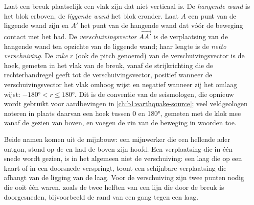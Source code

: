 \begin{definition}\label{def:b1:faults-folds-fabrics:fault-elements}
Laat een breuk plaatselijk een vlak zijn dat niet verticaal is. De \emph{hangende wand} is het blok erboven, de \emph{liggende wand} het blok eronder. Laat $A$ een punt van de liggende wand zijn en $A'$ het punt van de hangende wand dat vóór de beweging contact met het had.
De \emph{verschuivingsvector} $\overrightarrow{AA'}$ is de verplaatsing van de hangende wand ten opzichte van de liggende wand; haar lengte is de \emph{netto verschuiving}. De
\emph{rake} $r$ (ook de pitch genoemd) van de verschuivingsvector is de hoek, gemeten in het vlak van de breuk, vanaf de strijkrichting die de rechterhandregel geeft tot de verschuivingsvector, positief wanneer de verschuivingsvector het vlak omhoog wijst en negatief wanneer zij het omlaag wijst: $\ang{-180} < r \le \ang{180}$. Dit is de conventie van de seismologen, die opnieuw wordt gebruikt voor aardbevingen in \cref{ch:b1:earthquake-source}; veel veldgeologen noteren in plaats daarvan een hoek tussen 0 en \ang{180}, gemeten met de klok mee vanaf de  gezien van boven, en voegen de zin van de beweging in woorden toe.
\end{definition}

Beide namen komen uit de mijnbouw: een mijnwerker die een hellende ader ontgon, stond op de  en had de  boven zijn hoofd. Een verplaatsing die in één snede wordt gezien, is in het algemeen niet de verschuiving: een laag die op een kaart of in een doorsnede verspringt, toont een schijnbare verplaatsing die afhangt van de ligging van de laag. Voor de verschuiving zijn twee punten nodig die ooit één waren, zoals de twee helften van een lijn die door de breuk is doorgesneden, bijvoorbeeld de rand van een gang tegen een laag.

